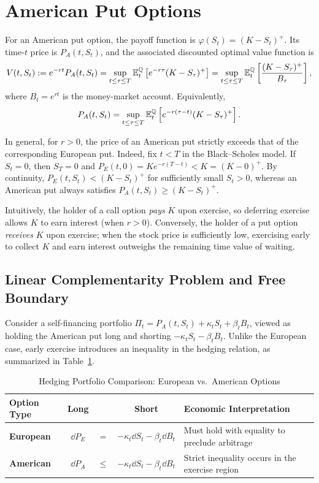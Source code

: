 \section{American Put Options}

For an American put option, the payoff function is $\varphi(S_t) = (K - S_t)^+$. Its time-$t$ price is $P_A(t, S_t)$, and the associated discounted optimal value function is
\[
V(t, S_t) := e^{-rt} P_A(t, S_t) = \sup_{t \le \tau \le T} \mathbb{E}_t^{\mathbb{Q}}\left[e^{-r\tau}(K - S_\tau)^+\right] = \sup_{t \le \tau \le T} \mathbb{E}_t^{\mathbb{Q}}\left[\frac{(K - S_\tau)^+}{B_\tau}\right],
\]
where $B_t = e^{rt}$ is the money-market account. Equivalently,
\[
P_A(t, S_t) = \sup_{t \le \tau \le T} \mathbb{E}_t^{\mathbb{Q}}\left[e^{-r(\tau - t)}(K - S_\tau)^+\right].
\]

In general, for $r > 0$, the price of an American put strictly exceeds that of the corresponding European put. Indeed, fix $t < T$ in the Black--Scholes model. If $S_t = 0$, then $S_T = 0$ and $P_E(t, 0) = K e^{-r(T-t)} < K = (K - 0)^+$. By continuity, $P_E(t, S_t) < (K - S_t)^+$ for sufficiently small $S_t > 0$, whereas an American put always satisfies $P_A(t, S_t) \ge (K - S_t)^+$.

Intuitively, the holder of a call option \emph{pays} $K$ upon exercise, so deferring exercise allows $K$ to earn interest (when $r > 0$). Conversely, the holder of a put option \emph{receives} $K$ upon exercise; when the stock price is sufficiently low, exercising early to collect $K$ and earn interest outweighs the remaining time value of waiting.

\subsection*{Linear Complementarity Problem and Free Boundary}

Consider a self-financing portfolio $\Pi_t = P_A(t, S_t) + \kappa_t S_t + \beta_t B_t$, viewed as holding the American put long and shorting $-\kappa_t S_t - \beta_t B_t$. Unlike the European case, early exercise introduces an inequality in the hedging relation, as summarized in Table~\ref{tab:hedging-eu-am}.

\begin{table}[!htbp]
    \centering
    \caption{Hedging Portfolio Comparison: European vs.\ American Options}\label{tab:hedging-eu-am}
    \begin{tabular}{l c c c l}
        \toprule
        \textbf{Option Type} & \textbf{Long} & & \textbf{Short} & \textbf{Economic Interpretation} \\
        \midrule
        \textbf{European} & $\dd P_E$ & $=$ & $-\kappa_t \dd S_t - \beta_t \dd B_t$ & Must hold with equality to preclude arbitrage \\
        \textbf{American} & $\dd P_A$ & $\le$ & $-\kappa_t \dd S_t - \beta_t \dd B_t$ & Strict inequality occurs in the exercise region \\
        \bottomrule
    \end{tabular}
\end{table}

